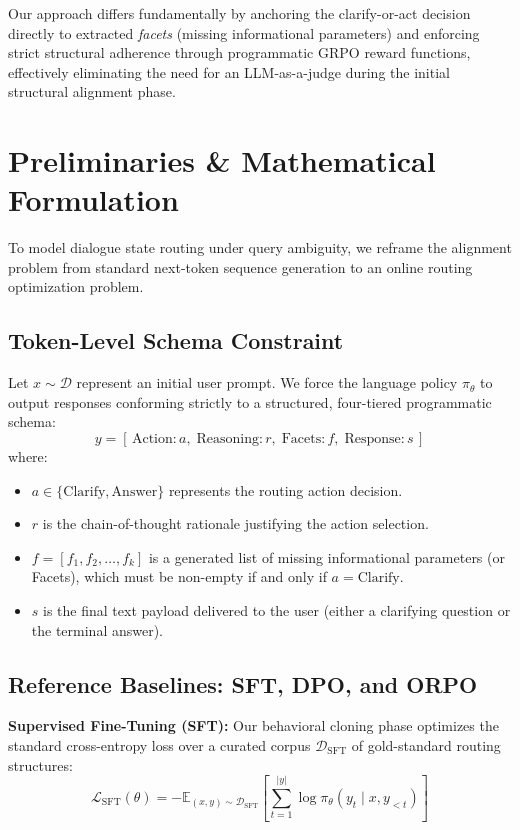 \documentclass{article}
\theoremstyle{plain}
\theoremstyle{definition}
\theoremstyle{remark}
\begin{document}
Our approach differs fundamentally by anchoring the clarify-or-act decision directly to extracted \emph{facets} (missing informational parameters) and enforcing strict structural adherence through programmatic GRPO reward functions, effectively eliminating the need for an LLM-as-a-judge during the initial structural alignment phase.

\section{Preliminaries \& Mathematical Formulation}
To model dialogue state routing under query ambiguity, we reframe the alignment problem from standard next-token sequence generation to an online routing optimization problem.

\subsection{Token-Level Schema Constraint}
Let $x \sim \mathcal{D}$ represent an initial user prompt. We force the language policy $\pi_\theta$ to output responses conforming strictly to a structured, four-tiered programmatic schema:
$$y = [\,\text{Action:}\, a, \;\text{Reasoning:}\, r, \;\text{Facets:}\, f, \;\text{Response:}\, s\,]$$ 
where:
\begin{itemize}
\item $a \in \{\text{Clarify}, \text{Answer}\}$ represents the routing action decision.
\item $r$ is the chain-of-thought rationale justifying the action selection.
\item $f = [f_1, f_2, \dots, f_k]$ is a generated list of missing informational parameters (or Facets), which must be non-empty if and only if $a = \text{Clarify}$.
\item $s$ is the final text payload delivered to the user (either a clarifying question or the terminal answer).
\end{itemize}

\subsection{Reference Baselines: SFT, DPO, and ORPO}

\textbf{Supervised Fine-Tuning (SFT):} Our behavioral cloning phase optimizes the standard cross-entropy loss over a curated corpus $\mathcal{D}_{\text{SFT}}$ of gold-standard routing structures:
$$\mathcal{L}_{\text{SFT}}(\theta) = -\mathbb{E}_{(x,y) \sim \mathcal{D}_{\text{SFT}}} \left[ \sum_{t=1}^{\vert y \vert} \log \pi_\theta(y_t \mid x, y_{<t}) \right]$$ 
\end{document}
